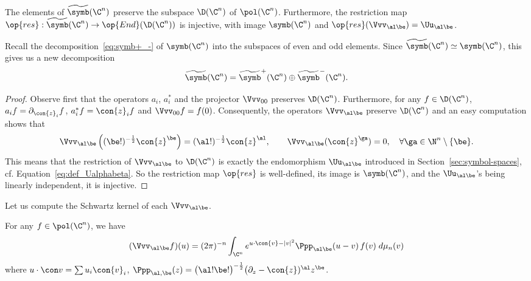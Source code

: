 \begin{prop}
The elements of $\widetilde{\symb} (\C^n)$ preserve the
subspace $\D (\C^n)$ of $\pol (\C^{n})$. Furthermore, the restriction map $\op{res} : \widetilde{\symb} (\C^n) \rightarrow \op{End} (\D (\C^{n}))$ is injective, with image $\symb (\C^n)$ and $\op{res} (\Vvv_{\al \be}) = \Uu_{\al
\be}$.
\end{prop}

Recall the decomposition~\eqref{eq:symb+_-} of $\symb (\C^n)$ into the subspaces of even and odd elements. Since $\widetilde \symb (\C^n) \simeq \symb (\C^n)$, this gives us a new decomposition
\[
\widetilde{\symb}
(\C^n) = \widetilde{\symb}^+ (\C^n) \oplus \widetilde{\symb}^-
(\C^n).
\]

\begin{proof}
Observe first that the operators $a_i$, $a_i^{*}$ and the projector $\Vvv_{00}$
preserves $\D (\C^n)$. Furthermore, for any $f \in \D (\C^n)$, $a_i f =
\partial_{\con{z}_i} f$, $a_i^{*} f = \con{z}_i f$ and $\Vvv_{00} f = f (0)$. Consequently, the operators $\Vvv_{\al \be}$ preserve $\D (\C^n)$ and an easy computation shows that
\[
\Vvv_{\al\be} \left((\be !)^{-\frac{1}{2}} \con{z}^\be \right) = (\al !)^{-\frac{1}{2}}
\con{z}^{\al}, \qquad \Vvv_{\al \be} (\con{z}^{\ga}) = 0, \quad \forall \ga \in \N^n
\setminus \{ \be \}.
\]
This means that the restriction of $\Vvv_{\al \be}$ to $\D (\C^n)$ is exactly the endomorphism $\Uu_{\al \be}$ introduced in Section~\ref{sec:symbol-spaces}, cf. Equation~\eqref{eq:def_Ualphabeta}. So the restriction map $\op{res}$ is well-defined, its image is $\symb (\C^n)$, and the $\Uu_{\al\be}$'s being linearly independent, it is injective.
\end{proof}

Let us compute the Schwartz kernel of each $\Vvv_{\al\be}$.

\begin{lemm}\label{lem_kenrel_u_alpha_beta}
For any $f \in \pol (\C^n)$, we have
\[
(\Vvv_{\al\be} f)(u) = (2 \pi)^{-n} \int_{\C^{n} } e^{ u\cdot \con{v} - |v|^2 }
\Ppp_{\al\be} (u-v) \, f(v) \; d\mu_n (v)
\]
where $u \cdot \con v = \sum u_i \con{v}_i$, $\Ppp_{\al,\be} (z) = \bigl(\al! \be ! \bigr) ^{-\frac{1}{2}} \bigl(
\partial_z - \con{z})^{\al} z^\be $.
\end{lemm}

